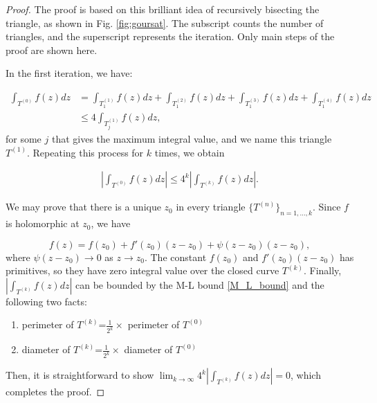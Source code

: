 \documentclass{article}
\begin{document}
\begin{proof}
The proof is based on this brilliant idea of recursively bisecting the triangle, as shown in Fig. \ref{fig:goursat}. The subscript counts the number of triangles, and the superscript represents the iteration. Only main steps of the proof are shown here. 

In the first iteration, we have:

\begin{equation*}
\begin{aligned}
\int_{T^{(0)}} f(z)dz&=\int_{T_1^{(1)}} f(z)dz+\int_{T_1^{(2)}} f(z)dz+\int_{T_1^{(3)}} f(z)dz+\int_{T_1^{(4)}} f(z)dz\\
&\leq4\int_{T_j^{(1)}} f(z)dz,
\end{aligned}
\end{equation*}
for some $j$ that gives the maximum integral value, and we name this triangle $T^{(1)}$. Repeating this process for $k$ times, we obtain

\begin{equation*}
\begin{aligned}
|\int_{T^{(0)}} f(z)dz|\leq4^k|\int_{T^{(k)}} f(z)dz|.
\end{aligned}
\end{equation*}

We may prove that there is a unique $z_0$ in every triangle $\{T^{(n)}\}_{n=1,...,k}$. Since $f$ is holomorphic at $z_0$, we have

\begin{equation*}
f(z)=f(z_0)+f'(z_0)(z-z_0)+\psi(z-z_0)(z-z_0),
\end{equation*}
where $\psi(z-z_0)\rightarrow0$ as $z\rightarrow z_0$. The constant $f(z_0)$ and $f'(z_0)(z-z_0)$ has primitives, so they have zero integral value over the closed curve $T^{(k)}$. Finally, $|\int_{T^{(k)}} f(z)dz|$ can be bounded by the M-L bound \eqref{M_L_bound}  and the following two facts:

\begin{enumerate}
\item
perimeter of $T^{(k)}$=$\frac{1}{2^k}\times$ perimeter of $T^{(0)}$

\item
diameter of $T^{(k)}$=$\frac{1}{2^k}\times$ diameter of $T^{(0)}$
\end{enumerate}

Then, it is straightforward to show $\lim_{k\rightarrow\infty}4^k|\int_{T^{(k)}} f(z)dz|=0$, which completes the proof. 

\end{proof}
\end{document}
